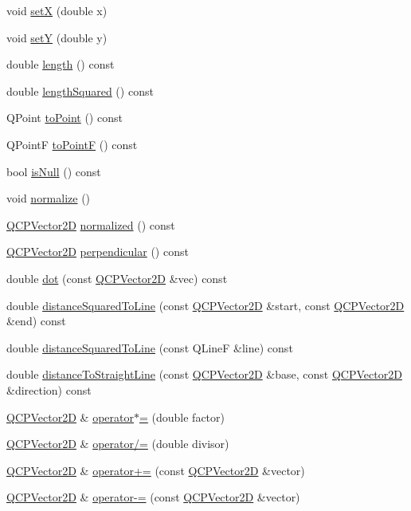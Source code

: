\begin{DoxyCompactItemize}
\item 
void \hyperlink{classQCPVector2D_ab4249e6ce7bfc37be56f014c54b761ae}{setX} (double x)
\item 
void \hyperlink{classQCPVector2D_ada288019aa8cd51e3b30acfc07b461dc}{setY} (double y)
\item 
double \hyperlink{classQCPVector2D_a27fa0549db12b6f204582f8119627d6a}{length} () const 
\item 
double \hyperlink{classQCPVector2D_a1332fad5a1cc1cc93ce781f8c01264b5}{length\+Squared} () const 
\item 
Q\+Point \hyperlink{classQCPVector2D_a2819d10ffc804ec01a124172ab529d97}{to\+Point} () const 
\item 
Q\+PointF \hyperlink{classQCPVector2D_ad31741991d463ab8afa4ccb58af7308b}{to\+PointF} () const 
\item 
bool \hyperlink{classQCPVector2D_ae096fb351096208281abea041cfcd3ec}{is\+Null} () const 
\item 
void \hyperlink{classQCPVector2D_ad83268be370685c2a0630acc0fb1a425}{normalize} ()
\item 
\hyperlink{classQCPVector2D}{Q\+C\+P\+Vector2D} \hyperlink{classQCPVector2D_a98087a9a89eed142185c8b5d04309ad3}{normalized} () const 
\item 
\hyperlink{classQCPVector2D}{Q\+C\+P\+Vector2D} \hyperlink{classQCPVector2D_a4cdadb1cda3c522a5c14c3f92db78b2a}{perpendicular} () const 
\item 
double \hyperlink{classQCPVector2D_a2decf61d2230103055830ba749e72ed2}{dot} (const \hyperlink{classQCPVector2D}{Q\+C\+P\+Vector2D} \&vec) const 
\item 
double \hyperlink{classQCPVector2D_a0f85a9c351640a4e0fc3c2a1a42d5d0c}{distance\+Squared\+To\+Line} (const \hyperlink{classQCPVector2D}{Q\+C\+P\+Vector2D} \&start, const \hyperlink{classQCPVector2D}{Q\+C\+P\+Vector2D} \&end) const 
\item 
double \hyperlink{classQCPVector2D_a465aa1d96ae076bf33a7ec6cc49722be}{distance\+Squared\+To\+Line} (const Q\+LineF \&line) const 
\item 
double \hyperlink{classQCPVector2D_a29e8472875754769397f0d47d727be41}{distance\+To\+Straight\+Line} (const \hyperlink{classQCPVector2D}{Q\+C\+P\+Vector2D} \&base, const \hyperlink{classQCPVector2D}{Q\+C\+P\+Vector2D} \&direction) const 
\item 
\hyperlink{classQCPVector2D}{Q\+C\+P\+Vector2D} \& \hyperlink{classQCPVector2D_aa52a246d168f475a4231c7bdfdac7df1}{operator$\ast$=} (double factor)
\item 
\hyperlink{classQCPVector2D}{Q\+C\+P\+Vector2D} \& \hyperlink{classQCPVector2D_aefa55eb9282c066a330ca281881e0ec0}{operator/=} (double divisor)
\item 
\hyperlink{classQCPVector2D}{Q\+C\+P\+Vector2D} \& \hyperlink{classQCPVector2D_aa2c34754ce8839b2d074dec741783c5e}{operator+=} (const \hyperlink{classQCPVector2D}{Q\+C\+P\+Vector2D} \&vector)
\item 
\hyperlink{classQCPVector2D}{Q\+C\+P\+Vector2D} \& \hyperlink{classQCPVector2D_a3a2e906bb924983bb801e89f28a3d566}{operator-\/=} (const \hyperlink{classQCPVector2D}{Q\+C\+P\+Vector2D} \&vector)
\end{DoxyCompactItemize}
